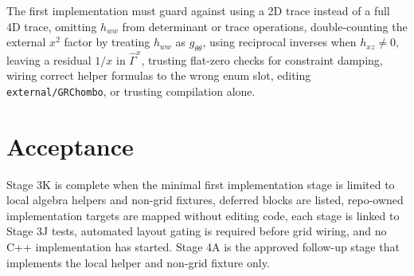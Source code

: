 \documentclass[11pt]{article}
\begin{document}
The first implementation must guard against using a 2D trace instead of a full
4D trace, omitting \(h_{ww}\) from determinant or trace operations,
double-counting the external \(x^2\) factor by treating \(h_{ww}\) as
\(g_{\theta\theta}\), using reciprocal inverses when \(h_{xz}\ne0\), leaving a
residual \(1/x\) in \(\hat{\Gamma}^{x}\), trusting flat-zero checks for
constraint damping, wiring correct helper formulas to the wrong enum slot,
editing \texttt{external/GRChombo}, or trusting compilation alone.

\section{Acceptance}

Stage 3K is complete when the minimal first implementation stage is limited to local
algebra helpers and non-grid fixtures, deferred blocks are listed, repo-owned
implementation targets are mapped without editing code, each stage is linked to
Stage 3J tests, automated layout gating is required before grid wiring, and no
C++ implementation has started. Stage 4A is the approved follow-up stage that
implements the local helper and non-grid fixture only.
\end{document}
